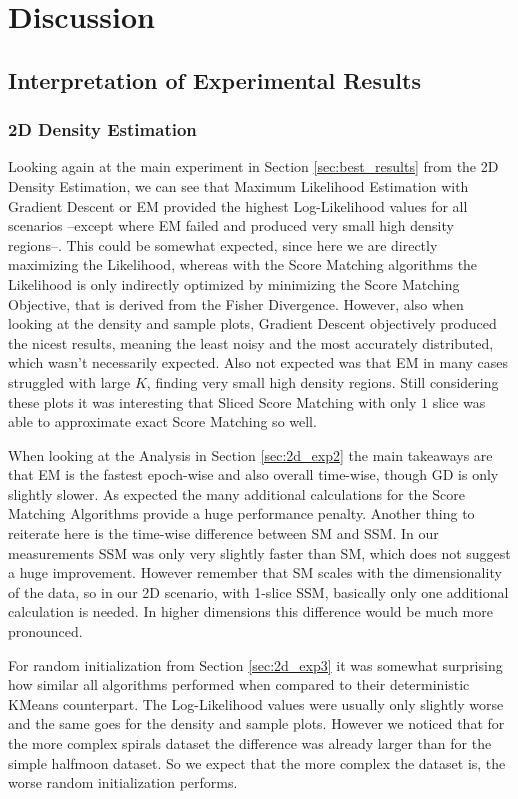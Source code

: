 \chapter{Discussion}
\label{cha:discussion}

\section{Interpretation of Experimental Results}

\subsection{2D Density Estimation}

Looking again at the main experiment in Section \ref{sec:best_results} from the 2D Density Estimation, we can see that
Maximum Likelihood Estimation with Gradient Descent or EM provided the highest Log-Likelihood values for all scenarios --except where EM failed and produced very small high density regions--. 
This could be somewhat expected, since here we are directly maximizing the Likelihood, whereas with the Score Matching algorithms the Likelihood
is only indirectly optimized by minimizing the Score Matching Objective, that is derived from the Fisher Divergence. 
However, also when looking at the density and sample plots, Gradient Descent objectively produced the nicest results, meaning the least 
noisy and the most accurately distributed, which wasn't necessarily expected.  
Also not expected was that EM in many cases struggled with large $K$, finding very small high density regions.
Still considering these plots it was interesting that Sliced Score Matching with only $1$ slice was able to approximate exact Score Matching so well.

When looking at the Analysis in Section \ref{sec:2d_exp2} the main takeaways are that EM is the fastest epoch-wise and also overall time-wise, 
though GD is only slightly slower. As expected the many additional calculations for the Score Matching Algorithms provide a huge 
performance penalty. Another thing to reiterate here is the time-wise difference between SM and SSM. In our measurements
SSM was only very slightly faster than SM, which does not suggest a huge improvement. 
However remember that SM scales with the dimensionality of the data, so in our 2D scenario, with
1-slice SSM, basically only one additional calculation is needed. In higher dimensions this difference would be much more pronounced. 

For random initialization from Section \ref{sec:2d_exp3} it was somewhat surprising how similar all algorithms performed when compared 
to their deterministic KMeans counterpart. The Log-Likelihood
values were usually only slightly worse and the same goes for the density and sample plots. However we noticed that for the more 
complex spirals dataset the difference was already larger than for the simple halfmoon dataset. So we expect that the more complex 
the dataset is, the worse random initialization performs.  

